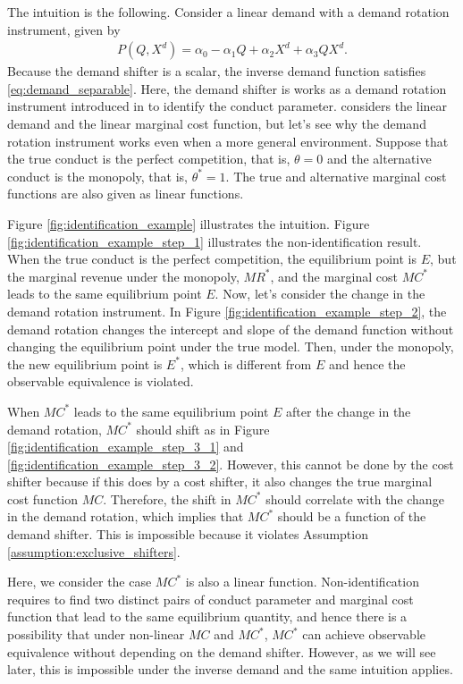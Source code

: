 \documentclass[11pt, a4paper]{article}
\theoremstyle{remark}
\begin{document}
The intuition is the following.
Consider a linear demand with a demand rotation instrument, given by
\begin{align}
    P(Q, X^{d}) = \alpha_0 - \alpha_1Q + \alpha_2X^{d} + \alpha_3QX^{d}. \label{eq:demand_counterexample}
\end{align}
Because the demand shifter is a scalar, the inverse demand function satisfies \eqref{eq:demand_separable}.
Here, the demand shifter is works as a demand rotation instrument introduced in \citet{bresnahan1982oligopoly} to identify the conduct parameter.
\citet{bresnahan1982oligopoly} considers the linear demand and the linear marginal cost function, but let's see why the demand rotation instrument works even when a more general environment.
Suppose that the true conduct is the perfect competition, that is, $\theta = 0$ and the alternative conduct is the monopoly, that is, $\theta^{*} = 1$.
The true and alternative marginal cost functions are also given as linear functions.

Figure \ref{fig:identification_example} illustrates the intuition.
Figure \ref{fig:identification_example_step_1} illustrates the non-identification result.
When the true conduct is the perfect competition, the equilibrium point is $E$, but the marginal revenue under the monopoly, $MR^{*}$, and the marginal cost $MC^{*}$ leads to the same equilibrium point $E$.
Now, let's consider the change in the demand rotation instrument.
In Figure \ref{fig:identification_example_step_2}, the demand rotation changes the intercept and slope of the demand function without changing the equilibrium point under the true model.
Then, under the monopoly, the new equilibrium point is $E^{*}$, which is different from $E$ and hence the observable equivalence is violated.

When $MC^{*}$ leads to the same equilibrium point $E$ after the change in the demand rotation, $MC^{*}$ should shift as in Figure \ref{fig:identification_example_step_3_1} and \ref{fig:identification_example_step_3_2}.
However, this cannot be done by the cost shifter because if this does by a cost shifter, it also changes the true marginal cost function $MC$.
Therefore, the shift in $MC^{*}$ should correlate with the change in the demand rotation, which implies that $MC^{*}$ should be a function of the demand shifter.
This is impossible because it violates Assumption \ref{assumption:exclusive_shifters}.

Here, we consider the case $MC^{*}$ is also a linear function.
Non-identification requires to find two distinct pairs of conduct parameter and marginal cost function that lead to the same equilibrium quantity, and hence there is a possibility that under non-linear $MC$ and $MC^{*}$, $MC^{*}$ can achieve observable equivalence without depending on the demand shifter.
However, as we will see later, this is impossible under the inverse demand and the same intuition applies.
\end{document}
